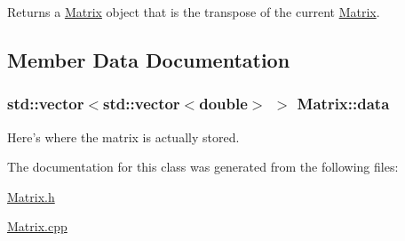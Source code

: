 Returns a \hyperlink{class_matrix}{Matrix} object that is the transpose of the current \hyperlink{class_matrix}{Matrix}. 



\subsection{Member Data Documentation}
\hypertarget{class_matrix_adab4557133e13b08ae470a8e5df7b99c}{
\subsubsection[{data}]{\setlength{\rightskip}{0pt plus 5cm}std::vector$<$std::vector$<$double$>$ $>$ {\bf Matrix::data}}}
\label{class_matrix_adab4557133e13b08ae470a8e5df7b99c}


Here's where the matrix is actually stored. 



The documentation for this class was generated from the following files:\begin{DoxyCompactItemize}
\item 
\hyperlink{_matrix_8h}{Matrix.h}\item 
\hyperlink{_matrix_8cpp}{Matrix.cpp}\end{DoxyCompactItemize}
